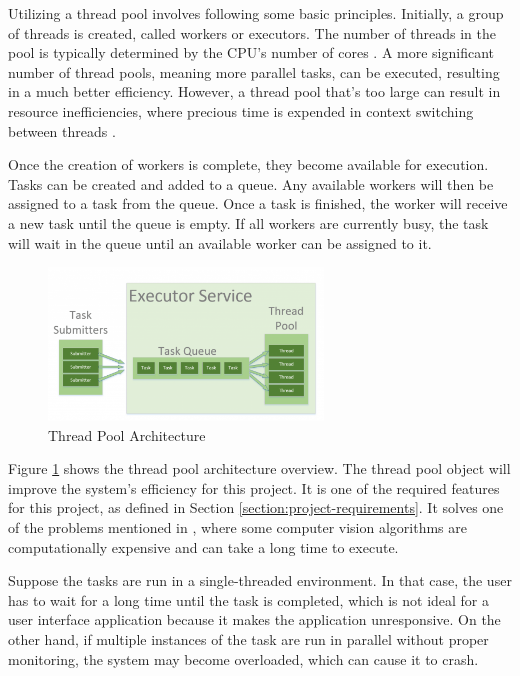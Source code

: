 Utilizing a thread pool involves following some basic principles. Initially, a group of threads is created, called workers or executors. The number of threads in the pool is typically determined by the CPU's number of cores \cite{GeekforGeek_2020}. A more significant number of thread pools, meaning more parallel tasks, can be executed, resulting in a much better efficiency. However, a thread pool that's too large can result in resource inefficiencies, where precious time is expended in context switching between threads \cite{GeekforGeek_2020}.

Once the creation of workers is complete, they become available for execution. Tasks can be created and added to a queue. Any available workers will then be assigned to a task from the queue. Once a task is finished, the worker will receive a new task until the queue is empty. If all workers are currently busy, the task will wait in the queue until an available worker can be assigned to it. \cite{GeekforGeek_2020}

\begin{figure}[!ht]
    \centering
    \includegraphics[width=0.65\textwidth]{texs/Part2/chapter1/image/threadpool.png}
    \caption{Thread Pool Architecture \cite{Paraschiv_2023}}
    \label{fig:thread-pool}
\end{figure}

Figure \ref{fig:thread-pool} shows the thread pool architecture overview. The thread pool object will improve the system's efficiency for this project. It is one of the required features for this project, as defined in Section \ref{section:project-requirements}. It solves one of the problems mentioned in \cite{Sabtu_2023}, where some computer vision algorithms are computationally expensive and can take a long time to execute.

Suppose the tasks are run in a single-threaded environment. In that case, the user has to wait for a long time until the task is completed, which is not ideal for a user interface application because it makes the application unresponsive. On the other hand, if multiple instances of the task are run in parallel without proper monitoring, the system may become overloaded, which can cause it to crash.

